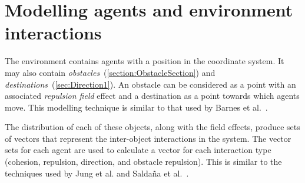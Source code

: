                                 

\section{Modelling agents and environment interactions}\label{method:AgentEnvironmentModel}
The environment contains agents with a position in the coordinate system. It may also contain \textit{obstacles}~(\autoref{section:ObstacleSection}) and \textit{destinations}~(\autoref{sec:Direction1}). An obstacle can be considered as a point with an associated \textit{repulsion field} effect and a destination as a point towards which agents move. This modelling technique is similar to that used by Barnes et al.~\cite{BAF:06, BAFVM:06}. 

The distribution of each of these objects, along with the field effects, produce sets of vectors that represent the inter-object interactions in the system. The vector sets for each agent are used to calculate a vector for each interaction type (cohesion, repulsion, direction, and obstacle repulsion). This is similar to the techniques used by Jung et al. and Salda\~na et al.~\cite{JG:13, SOM:12}. 

